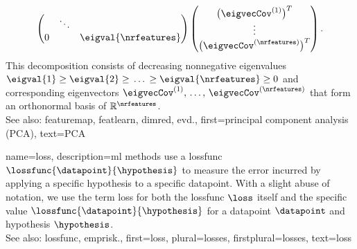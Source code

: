 {{$$\begin{pmatrix}
			& \ddots &   \\
			0                 &        & \eigval{\nrfeatures}
			\end{pmatrix}
			\begin{pmatrix}
			\big(\eigvecCov^{(1)}\big)^{T} \\
			\vdots                         \\
			\big(\eigvecCov^{(\nrfeatures)}\big)^{T}
		\end{pmatrix}.$$
		This decomposition consists of decreasing nonnegative \glspl{eigenvalue} 
		$\eigval{1} \geq \eigval{2} \geq \,\ldots \,\geq \eigval{\nrfeatures} 
		\geq 0$ and corresponding \glspl{eigenvector} $\eigvecCov^{(1)},\,\ldots,\,\eigvecCov^{(\nrfeatures)}$ 
		that form an orthonormal \gls{basis} of $\mathbb{R}^{\nrfeatures}$.
				 \\
		See also: \gls{featuremap}, \gls{featlearn}, \gls{dimred}, \gls{evd}.},
	first={principal component analysis (PCA)},
	text={PCA} 
}
	
{name={loss}, 
	description={\gls{ml} methods use a 
		\gls{lossfunc} $\lossfunc{\datapoint}{\hypothesis}$ to measure the error incurred 
		by applying a specific \gls{hypothesis} to a specific \gls{datapoint}. With a
		slight abuse of notation, we use the term loss for both the \gls{lossfunc} $\loss$ 
		itself and the specific value $\lossfunc{\datapoint}{\hypothesis}$ for a \gls{datapoint} $\datapoint$ 
		and \gls{hypothesis} $\hypothesis$.
				\\
		See also: \gls{lossfunc}, \gls{emprisk}.},
	first={loss},
	plural={losses},
	firstplural={losses},
	text={loss} 
}

